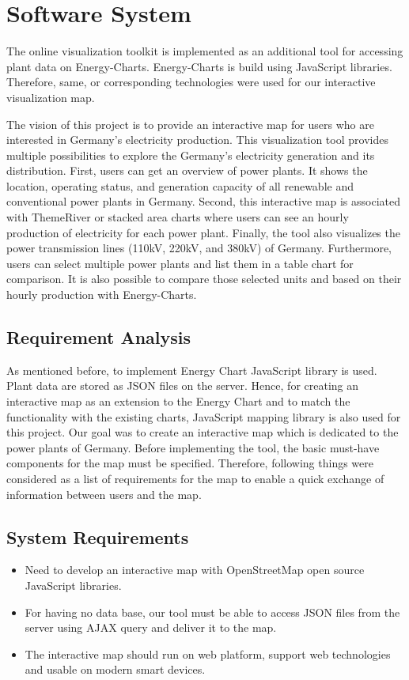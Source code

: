 \chapter{Software System}
\label{chap:softwareSystem}

The online visualization toolkit is implemented as an additional tool for accessing plant data on Energy-Charts. Energy-Charts is build using JavaScript libraries. Therefore, same, or corresponding technologies were used for our interactive visualization map. 

The vision of this project is to provide an interactive map for users who are interested in Germany’s electricity production.  This visualization tool provides multiple possibilities to explore the Germany’s electricity generation and its distribution. First, users can get an overview of power plants. It shows the location, operating status, and generation capacity of all renewable and conventional power plants in Germany. Second, this interactive map is associated with ThemeRiver or stacked area charts where users can see an hourly production of electricity for each power plant. Finally, the tool also visualizes the power transmission lines (110kV, 220kV, and 380kV) of Germany. Furthermore, users can select multiple power plants and list them in a table chart for comparison. It is also possible to compare those selected units and based on their hourly production with Energy-Charts. 

\section{Requirement Analysis}
\label{sec:reqAn}

As mentioned before, to implement Energy Chart JavaScript library is used. Plant data are stored as JSON files on the server. Hence, for creating an interactive map as an extension to the Energy Chart and to match the functionality with the existing charts, JavaScript mapping library is also used for this project. Our goal was to create an interactive map which is dedicated to the power plants of Germany. Before implementing the tool, the basic must-have components for the map must be specified. Therefore, following things were considered as a list of requirements for the map to enable a quick exchange of information between users and the map.

\section*{System Requirements}
\begin{itemize}
	\item{Need to develop an interactive map with OpenStreetMap open source JavaScript libraries.}
	\item{For having no data base, our tool must be able to access JSON files from the server using AJAX query and deliver it to the map.}
	\item{The interactive map should run on web platform, support web technologies and usable on modern smart devices.}
\end{itemize}


